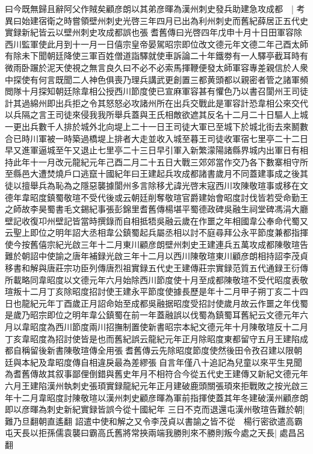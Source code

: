 曰今既無歸且辭阿父作賊矣顧彦朗以其弟彦暉為漢州刺史發兵助建急攻成都　|{
	考異曰始建宿衛之時嘗領壁州刺史光啓三年四月已出為利州刺史而舊紀薛居正五代史實録新紀皆云以壁州刺史攻成都誤也張耆舊傳曰光啓四年戊申十月十日田軍容除西川監軍使此月到十一月一日僖宗皇帝晏駕昭宗即位改文德元年文德二年己酉太師有除未下聞朝廷降使三軍百姓僧道詣驛就使車訴論二十年鐵劵有一人驛亭截耳時有微雨卧蹍於泥天使視之無言良久曰不必不必索馬揮鞭便發太師軍容專差親信於人衆中探使有何言既聞二人神色俱喪乃理兵講武更創置三都黄頭都以親密者管之諸軍頻閲隊十月探知朝廷除韋相公授西川節度使已宣麻軍容甚有懼色乃以書召閬州王司徒計其過綿州即出兵拒之令其怒怒必攻諸州所在出兵交戰此是軍容計恐韋相公來交代以兵隔之言王司徒來侵我我所舉兵蓋與王氏相敵欲遮其反名十二月二十日驅人上城一更出兵數千人排於城外北向堤上二十一日王司徒大軍已至城下於城北街去來鬭數合已時川軍被一時築過橋堤上排者大走並收入城至暮王司徒收軍宿七里亭二十二日早又進軍逼城至午又退止七里亭二十三日早引軍入新繁濛陽諸縣界城内出軍日有相持此年十一月改元龍紀元年己酉二月二十五日大戰三郊郊當作交乃各下數寨相守所至縣邑大遭焚燒戶口逃竄十國紀年曰王建起兵攻成都諸書歲月不同蓋建事成之後其徒以擅舉兵為恥為之隱惡襲據閬州多言除移尤諱光啓末寇西川攻陳敬瑄事或移在文德年韋昭度鎮蜀敬瑄不受代後或云朝廷削奪敬瑄官爵建始會昭度討伐皆若受命勤王之師故李昊蜀書毛文錫紀事張彭錦里耆舊傳楊堪平蜀德政碑吳融生祠堂碑馮涓大廳壁記收復卭州壁記皆當時撰錄而自相抵牾吳融云歲在作噩之年相國韋公奉命代蜀又云聖上即位之明年詔大丞相韋公鎮蜀起兵屬丞相以討不庭尋拜公永平節度兼都指揮使今按舊僖宗紀光啟三年十二月東川顧彦朗壁州刺史王建連兵五萬攻成都陳敬瑄告難於朝詔中使諭之唐年補録光啟三年十二月以西川陳敬瑄東川顧彦朗相持詔李茂貞移書和解與唐莊宗功臣列傳唐烈祖實録五代史王建傳莊宗實録范質五代通録王衍傳所載略同韋昭度以文德元年六月始除西川節度使十月至成都陳敬瑄不受代昭度表敬瑄叛十二月丁亥除昭度招討使王建永平節度使據長歷是年十二月甲子朔丁亥二十四日也龍紀元年丁酉歲正月詔命始至成都吳融据昭度受招討使歲月故云作噩之年伐蜀是歲乃昭宗即位之明年韋公鎮蜀在前一年蓋融誤以伐蜀為鎮蜀耳舊紀云文德元年六月以韋昭度為西川節度兩川招撫制置使新書昭宗本紀文德元年十月陳敬瑄反十二月丁亥韋昭度為招討使皆是也而舊紀誤云龍紀元年正月除昭度東都留守五月王建陷成都自稱留後新書陳敬瑄傳全用張耆舊傳云先除昭度節度使然後田令孜召建以限朝廷與本紀及韋昭度傳自相違戾最為差繆張自言年僅八十追記為兒童以來平生見聞為耆舊傳故其叙事鄙俚倒錯與舊史年月不相符合今從五代史王建傳又新紀文德元年六月王建陷漢州執刺史張頊實録龍紀元年正月建破鹿頭關張頊來拒戰敗之按光啟三年十二月韋昭度討陳敬瑄以漢州刺史顧彦暉為軍前指揮使蓋其年冬建破漢州顧彦朗即以彦暉為刺史新紀實録皆誤今從十國紀年}
三日不克而退還屯漢州敬瑄告難於朝|{
	難乃旦翻朝直遙翻}
詔遣中使和解之又令李茂貞以書諭之皆不從　楊行密欲遣高霸屯天長以拒孫儒袁襲曰霸高氏舊將常挾兩端我勝則來不勝則叛今處之天長|{
	處昌呂翻}
